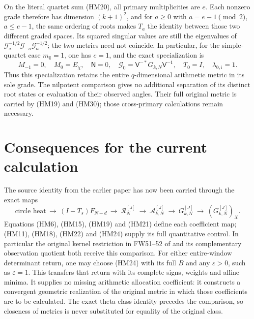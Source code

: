 \documentclass[11pt]{article}
\begin{document}
On the literal quartet sum (HM20), all primary multiplicities are $e$.
Each nonzero grade therefore has dimension $(k+1)^2$, and for $a\ge0$
with $a=e-1\pmod2$, $a\le e-1$, the same ordering of roots makes
$T_a$ the identity between those two different graded spaces. Its
squared singular values are still the eigenvalues of
$\mathcal G_a^{-1/2}\mathcal G_{-a}\mathcal G_a^{-1/2}$; the two
metrics need not coincide. In particular, for the simple-quartet case
$m_0=1$, one has $e=1$, and the exact specialization is
\begin{equation}\tag{HM30}
 M_{-1}=0,\quad M_0=E_\chi,\quad \mathsf N=0,\quad
 \mathcal G_0=\mathsf V^{-*}G_{k,N}\mathsf V^{-1},\quad
 T_0=I,\quad\lambda_{0,i}=1.
\end{equation}
Thus this specialization retains the entire $q$-dimensional arithmetic
metric in its sole grade. The nilpotent comparison gives no additional
separation of its distinct root states or evaluation of their observed
angles. Their full original metric is carried by (HM19) and (HM30);
those cross-primary calculations remain necessary.

\section{Consequences for the current calculation}
The source identity from the earlier paper has now been carried through
the exact maps
\[
 \text{circle heat}\ \longrightarrow\ (I-T_s)F_{N-d}\
 \longrightarrow\ \mathcal R_N^{[J]}\
 \longrightarrow\ \mathcal A_{k,N}^{[J]}\
 \longrightarrow\ G_{k,N}^{[J]}\
 \longrightarrow\ (G_{k,N}^{[J]})_X.
\]
Equations (HM6), (HM15), (HM19) and (HM21) define each coefficient map;
(HM11), (HM18), (HM22) and (HM24) supply its full quantitative control.
In particular the original kernel restriction in FW51--52 of
\cite{fullwindow} and its complementary observation quotient both
receive this comparison. For either entire-window determinant return,
one may choose (HM24) with its full $B$ and any $\varepsilon>0$, such
as $\varepsilon=1$. This transfers that return with its complete signs,
weights and affine minima. It supplies no missing arithmetic allocation
coefficient: it constructs a convergent geometric realization of the
original metric in which those coefficients are to be calculated.
The exact theta-class identity precedes the comparison, so closeness of
metrics is never substituted for equality of the original class.
\end{document}

